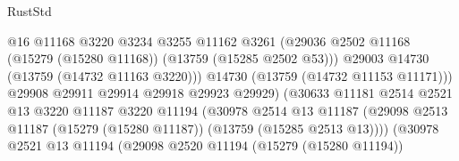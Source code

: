 \begin{lexlean}{RustStd}
\begin{coremodule}
                                              @16
                                              @11168
                                              @3220
                                              @3234
                                              @3255
                                              @11162
                                              @3261
                                              (@29036
                                                @2502
                                                @11168
                                                (@15279 (@15280 @11168))
                                                (@13759 (@15285 @2502 @53)))
                                              @29003
                                              @14730
                                              (@13759 (@14732 @11163 @3220)))
                                            @14730
                                            (@13759 (@14732 @11153 @11171)))
                                          @29908
                                          @29911
                                          @29914
                                          @29918
                                          @29923
                                          @29929)
                                        (@30633
                                          @11181
                                          @2514
                                          @2521
                                          @13
                                          @3220
                                          @11187
                                          @3220
                                          @11194
                                          (@30978
                                            @2514
                                            @13
                                            @11187
                                            (@29098
                                              @2513
                                              @11187
                                              (@15279 (@15280 @11187))
                                              (@13759 (@15285 @2513 @13))))
                                          (@30978
                                            @2521
                                            @13
                                            @11194
                                            (@29098
                                              @2520
                                              @11194
                                              (@15279 (@15280 @11194))

\end{coremodule}
\end{lexlean}
